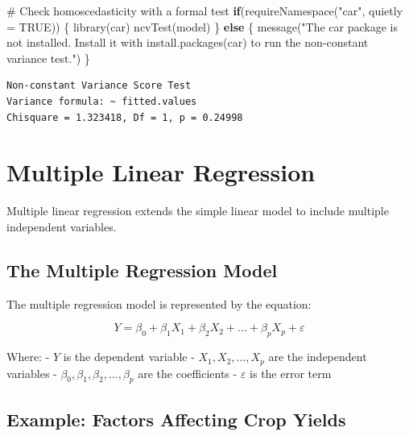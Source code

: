 \documentclass[
  letterpaper,
]{book}
\newenvironment{Shaded}{\begin{snugshade}}{\end{snugshade}}
\newcommand{\AttributeTok}[1]{\textcolor[rgb]{0.40,0.45,0.13}{#1}}
\newcommand{\CommentTok}[1]{\textcolor[rgb]{0.37,0.37,0.37}{#1}}
\newcommand{\ConstantTok}[1]{\textcolor[rgb]{0.56,0.35,0.01}{#1}}
\newcommand{\ControlFlowTok}[1]{\textcolor[rgb]{0.00,0.23,0.31}{\textbf{#1}}}
\newcommand{\FunctionTok}[1]{\textcolor[rgb]{0.28,0.35,0.67}{#1}}
\newcommand{\NormalTok}[1]{\textcolor[rgb]{0.00,0.23,0.31}{#1}}
\newcommand{\StringTok}[1]{\textcolor[rgb]{0.13,0.47,0.30}{#1}}
\begin{document}
\begin{Shaded}
\begin{Highlighting}[]
\CommentTok{\# Check homoscedasticity with a formal test}
\ControlFlowTok{if}\NormalTok{(}\FunctionTok{requireNamespace}\NormalTok{(}\StringTok{"car"}\NormalTok{, }\AttributeTok{quietly =} \ConstantTok{TRUE}\NormalTok{)) \{}
  \FunctionTok{library}\NormalTok{(car)}
  \FunctionTok{ncvTest}\NormalTok{(model)}
\NormalTok{\} }\ControlFlowTok{else}\NormalTok{ \{}
  \FunctionTok{message}\NormalTok{(}\StringTok{"The \textquotesingle{}car\textquotesingle{} package is not installed. Install it with install.packages(\textquotesingle{}car\textquotesingle{}) to run the non{-}constant variance test."}\NormalTok{)}
\NormalTok{\}}
\end{Highlighting}
\end{Shaded}

\begin{verbatim}
Non-constant Variance Score Test 
Variance formula: ~ fitted.values 
Chisquare = 1.323418, Df = 1, p = 0.24998
\end{verbatim}

\section{Multiple Linear Regression}\label{multiple-linear-regression}

Multiple linear regression extends the simple linear model to include
multiple independent variables.

\subsection{The Multiple Regression
Model}\label{the-multiple-regression-model}

The multiple regression model is represented by the equation:

\[Y = \beta_0 + \beta_1X_1 + \beta_2X_2 + ... + \beta_pX_p + \varepsilon\]

Where: - \(Y\) is the dependent variable - \(X_1, X_2, ..., X_p\) are
the independent variables - \(\beta_0, \beta_1, \beta_2, ..., \beta_p\)
are the coefficients - \(\varepsilon\) is the error term

\subsection{Example: Factors Affecting Crop
Yields}\label{example-factors-affecting-crop-yields}
\end{document}
